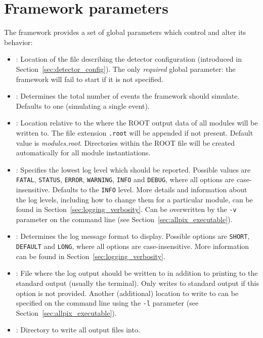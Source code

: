 \section{Framework parameters}
\label{sec:framework_parameters}
The \apsq framework provides a set of global parameters which control and alter its behavior:
\begin{itemize}
\item {}: Location of the file describing the detector configuration (introduced in Section~\ref{sec:detector_config}).
The only \textit{required} global parameter: the framework will fail to start if it is not specified.
\item {}: Determines the total number of events the framework should simulate.
Defaults to one (simulating a single event).
\item {}: Location relative to the  where the ROOT output data of all modules will be written to. The file extension \texttt{.root} will be appended if not present.
Default value is \textit{modules.root}.
Directories within the ROOT file will be created automatically for all module instantiations.
\item {}: Specifies the lowest log level which should be reported.
Possible values are \texttt{FATAL}, \texttt{STATUS}, \texttt{ERROR}, \texttt{WARNING}, \texttt{INFO} and \texttt{DEBUG}, where all options are case-insensitive.
Defaults to the \texttt{INFO} level.
More details and information about the log levels, including how to change them for a particular module, can be found in Section~\ref{sec:logging_verbosity}.
Can be overwritten by the \texttt{-v} parameter on the command line (see Section~\ref{sec:allpix_executable}).
\item {}: Determines the log message format to display.
Possible options are \texttt{SHORT}, \texttt{DEFAULT} and \texttt{LONG}, where all options are case-insensitive.
More information can be found in Section~\ref{sec:logging_verbosity}.
\item {}: File where the log output should be written to in addition to printing to the standard output (usually the terminal).
Only writes to standard output if this option is not provided.
Another (additional) location to write to can be specified on the command line using the \texttt{-l} parameter (see Section~\ref{sec:allpix_executable}).
\item {}: Directory to write all output files into.

\end{itemize}
